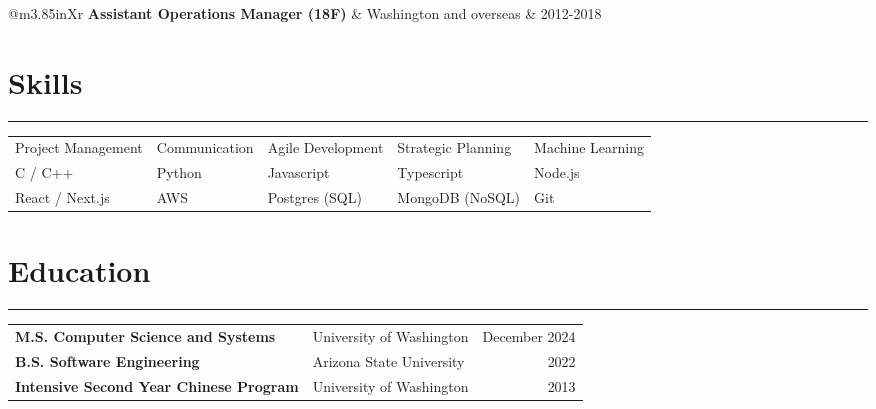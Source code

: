 \documentclass[letterpaper,11pt]{article}
\begin{document}
\begin{mdframed}[backgroundcolor=white,linewidth=0.5pt,topline=false,rightline=false,bottomline=false,innerbottommargin=-15px,innerrightmargin=0px,innertopmargin=5px,innerleftmargin=5px,leftmargin=3px]
\begin{tabularx}{\linewidth}{@{}m{3.85in}Xr}
    \textbf{Assistant Operations Manager (18F)}          & Washington and overseas & 2012-2018                           \\
  \end{tabularx}
\end{mdframed}

\vspace{-20px}
\section*{Skills}
\hrule
\begin{tabularx}{\linewidth}{@{}YYYYY@{}}
  Project Management & Communication & Agile Development & Strategic Planning & Machine Learning \\
  C / C++            & Python        & Javascript        & Typescript         & Node.js          \\
  React / Next.js    & AWS           & Postgres (SQL)    & MongoDB (NoSQL)    & Git              \\
\end{tabularx}

\vspace{-5px}
\section*{Education}
\hrule
\begin{tabularx}{\linewidth}{@{}XXr@{}}
  \textbf{M.S. Computer Science and Systems}     & University of Washington & December 2024 \\
  \textbf{B.S. Software Engineering}             & Arizona State University & 2022          \\
  \textbf{Intensive Second Year Chinese Program} & University of Washington & 2013          \\
\end{tabularx}
\end{document}
